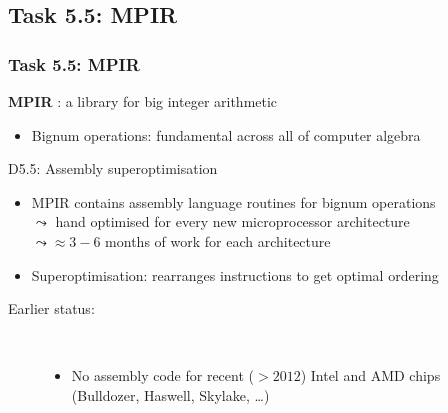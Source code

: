 \documentclass{beamer}
\begin{document}
\subsection{Task 5.5: MPIR}
\begin{frame}
  \frametitle{Task 5.5: MPIR}
\begin{center}
  {\Large  \textbf{MPIR} : a library for big integer arithmetic}
\end{center}
\begin{itemize}
  \item Bignum operations: fundamental across all of computer algebra
  \end{itemize}

  \begin{block}
    {D5.5: Assembly superoptimisation}
    \begin{itemize}
    \item MPIR contains assembly language routines for bignum operations
    \\ $\leadsto$ hand optimised for every new microprocessor architecture
    \\ $\leadsto \approx 3-6$ months of work for each architecture
    \item Superoptimisation: rearranges instructions to get optimal
      ordering
    \end{itemize}

    \begin{description}
      \item[Earlier status:]\
        \begin{itemize}
        \item No assembly code for recent ($> 2012$) Intel and AMD chips (Bulldozer,
          Haswell, Skylake, \dots)
        \end{itemize}
            \end{description}



    \end{block}
\end{frame}
\end{document}
